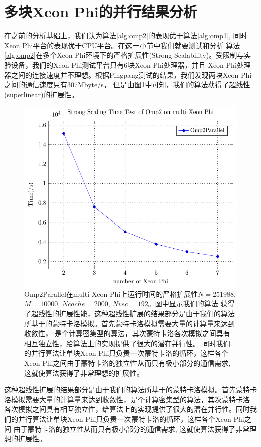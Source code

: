 \section{多块Xeon Phi的并行结果分析} %
\label{sec:multiMIC}
在之前的分析基础上，我们认为算法\ref{alg:omp2}的表现优于算法\ref{alg:omp1}, 同时Xeon Phi平台的表现优于CPU平台。在这一小节中我们就要测试和分析
算法\ref{alg:omp2}在多个Xeon Phi环境下的严格扩展性(Strong Scalability)。受限制与实验设备，我们的Xeon Phi测试平台只有6块Xeon Phi处理器，并且
Xeon Phi处理器之间的连接速度并不理想。根据Pingpang测试的结果，我们发现两块Xeon Phi之间的通信速度只有307Mbyte/s，
但是由图\ref{fig:scale}中可知，我们的算法获得了超线性(superlinear)的扩展性。
\begin{figure}[!t]
   \centering
   \includegraphics[width=\textwidth]{chap5/Figures/bsmpi-mic-scale.pdf}
   \caption{Omp2Parallel在multi-Xeon Phi上运行时间的严格扩展性$N=251988$, $M=10000$, $Ncache=2000$, $Nvec=192$。图中显示我们的算法
	   获得了超线性的扩展性能，这种超线性扩展的结果部分是由于我们的算法所基于的蒙特卡洛模拟。首先蒙特卡洛模拟需要大量的计算量来达到收敛性，
		   是个计算密集型的算法，其次蒙特卡洛各次模拟之间具有相互独立性，给算法上的实现提供了很大的潜在并行性。
		   同时我们的并行算法让单块Xeon Phi只负责一次蒙特卡洛的循环，这样各个Xeon Phi之间由于蒙特卡洛的独立性从而只有极小部分的通信需求,
		   这就使算法获得了非常理想的扩展性。}
   \label{fig:scale}
\end{figure}
这种超线性扩展的结果部分是由于我们的算法所基于的蒙特卡洛模拟。首先蒙特卡洛模拟需要大量的计算量来达到收敛性，是个计算密集型的算法，其次蒙特卡洛
各次模拟之间具有相互独立性，给算法上的实现提供了很大的潜在并行性。同时我们的并行算法让单块Xeon Phi只负责一次蒙特卡洛的循环，这样各个Xeon Phi之间
由于蒙特卡洛的独立性从而只有极小部分的通信需求, 这就使算法获得了非常理想的扩展性。

